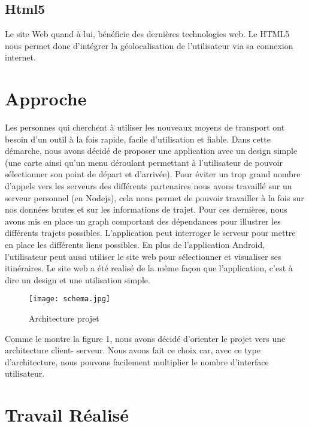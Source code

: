 \documentclass[twocolumn]{article}   		%
\begin{document}
	\subsection{Html5} 
	
	Le site Web quand \`a lui, b\'en\'eficie des derni\`eres technologies web. Le HTML5 nous permet donc d'int\'egrer la g\'eolocalisation de l'utilisateur via sa connexion internet.
	

\section{Approche}

	Les personnes qui cherchent \`a utiliser les nouveaux moyens de transport ont besoin d'un outil \`a la fois rapide, facile d'utilisation et fiable. Dans cette d\'emarche, nous avons d\'ecid\'e de proposer une application avec un design simple (une carte ainsi qu'un menu d\'eroulant permettant \`a l'utilisateur de pouvoir s\'electionner son point de d\'epart et d'arriv\'ee). Pour \'eviter un trop grand nombre d'appels vers les serveurs des diff\'erents partenaires nous avons travaill\'e sur un serveur personnel (en Nodejs), cela nous permet de pouvoir travailler \`a la fois sur nos donn\'ees brutes et sur les informations de trajet. Pour ces derni\`eres, nous avons mis en place un graph comportant des d\'ependances pour illustrer les diff\'erents trajets possibles. L'application peut interroger le serveur pour mettre en place les diff\'erents liens possibles.
	 En plus de l'application Android, l'utilisateur peut aussi utiliser le site web pour s\'electionner et visualiser ses itin\'eraires. Le site web a \'et\'e realis\'e de la m\^eme fa\c con que l'application, c'est \`a dire un design et une utilisation simple.
	
	\begin{figure}[!h]
	\centering
   	\texttt{[image: schema.jpg]}
   	\caption{\label{bookOcl} Architecture projet}
	\end{figure}
Comme le montre la figure 1, nous avons d\'ecid\'e d'orienter le projet vers une architecture client- serveur. Nous avons fait ce choix car, avec ce type d'architecture, nous pouvons facilement multiplier le nombre d'interface utilisateur.

\section{Travail R\'ealis\'e}
\end{document}
